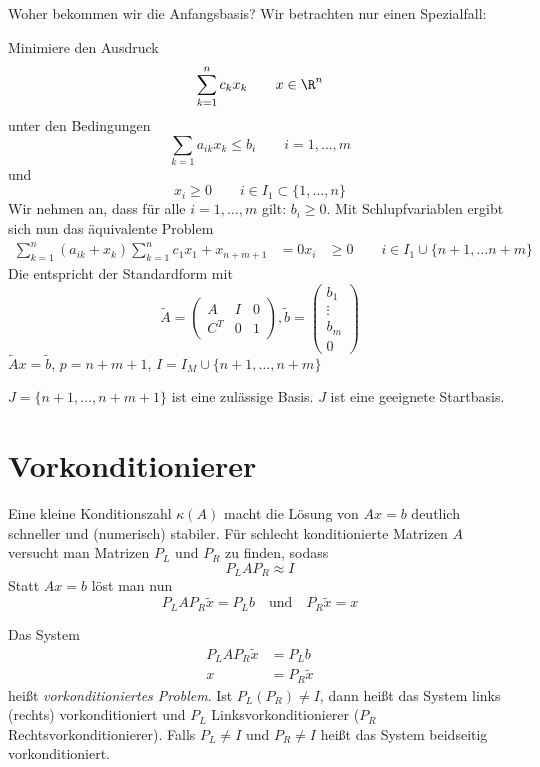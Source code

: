 \documentclass[a4paper]{scrartcl}
\numberwithin{equation}{section}
\begin{document}
\begin{seg}{Woher bekommen wir die Anfangsbasis?}
	Wir betrachten nur einen Spezialfall:

	Minimiere den Ausdruck 
	\[
		\sum_{k=1}^nc_kx_k \qquad x\in \R^n
	\]
	unter den Bedingungen
	\[
		\sum_{k=1}a_{ik}x_k \le b_i \qquad i=1,\dotsc,m
	\]
	und
	\[
		x_i \ge 0 \qquad i\in I_1\subset \{1,\dotsc,n\}
	\]
	Wir nehmen an, dass für alle $i=1,\dotsc,m$ gilt: $b_i\ge 0$.
	Mit Schlupfvariablen ergibt sich nun das äquivalente Problem
	\begin{align*}
		\sum_{k=1}^n(a_{ik}+x_k)
		\sum_{k=1}^n c_1x_1 + x_{n+m+1}&=0
		x_i &\ge 0 \qquad i\in I_1 \cup\{n+1,\dotsc n+m\}
	\end{align*}
	Die entspricht der Standardform mit
	\[
		\tilde A = \begin{pmatrix} A & I & 0 \\ C^T & 0 & 1\end{pmatrix}, \tilde b = \begin{pmatrix}b_1\\\vdots \\ b_m \\0\end{pmatrix}
	\]
	$\tilde A x = \tilde b$, $p=n+m+1$, $I=I_M\cup\{n+1,\dotsc,n+m\}$
	
	$J=\{n+1,\dotsc,n+m+1\}$ ist eine zulässige Basis.
	$J$ ist eine geeignete Startbasis.
\end{seg}


\section{Vorkonditionierer}

Eine kleine Konditionszahl $\kappa(A)$ macht die Lösung von $Ax=b$ deutlich schneller und (numerisch) stabiler.
Für schlecht konditionierte Matrizen $A$ versucht man Matrizen $P_L$ und $P_R$ zu finden, sodass
\[
	P_LAP_R \approx I
\]
Statt $Ax=b$ löst man nun
\[
	P_LAP_R\tilde x = P_Lb \quad \text{und} \quad P_R\tilde x = x
\]
\begin{df}
	\label{df:6.1}
	Das System
	\begin{align*}
		P_L A P_R\tilde x &= P_L b\\
		x&=P_R\tilde x
	\end{align*}
	heißt \emph{vorkonditioniertes Problem}.
	Ist $P_L(P_R)\neq I$, dann heißt das System links (rechts) vorkonditioniert und $P_L$ Linksvorkonditionierer ($P_R$ Rechtsvorkonditionierer).
	Falls $P_L\neq I$ und $P_R\neq I$ heißt das System beidseitig vorkonditioniert.
\end{df}
\end{document}
